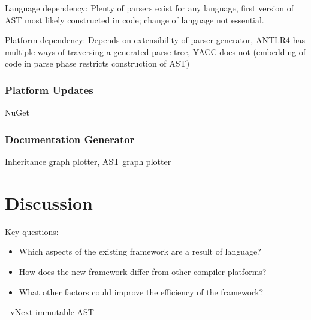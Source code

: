 \documentclass[twoside,openright]{uva-bachelor-thesis}
\begin{document}
			Language dependency: Plenty of parsers exist for any language, first version of AST most likely constructed in code; change of language not essential.
			
			Platform dependency: Depends on extensibility of parser generator, ANTLR4 has multiple ways of traversing a generated parse tree, YACC does not (embedding of code in parse phase restricts construction of AST)
			
		\subsection{Platform Updates}
			NuGet
			
		\subsection{Documentation Generator}
			Inheritance graph plotter, AST graph plotter
	
	
\chapter{Discussion}
	Key questions:
	\begin{itemize}
		\item Which aspects of the existing framework are a result of language?
		\item How does the new framework differ from other compiler platforms?
		\item What other factors could improve the efficiency of the framework?
	\end{itemize}
	
	- vNext immutable AST
	- 



\end{document}
